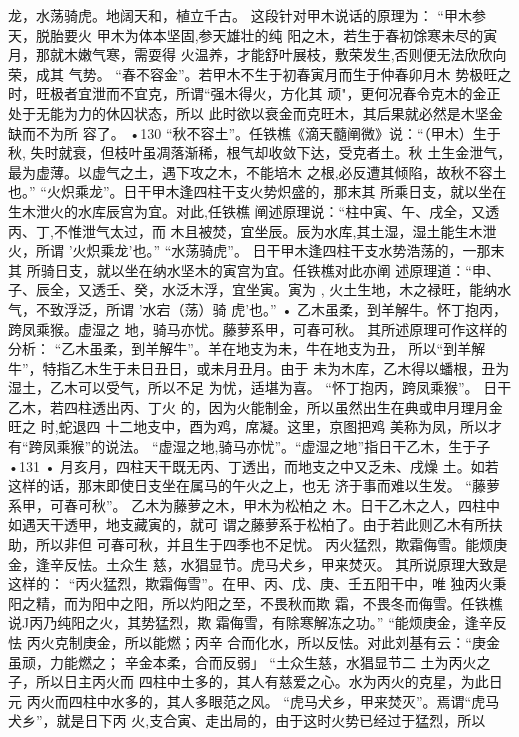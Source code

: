 龙，水荡骑虎。地阔天和，植立千古。
这段针对甲木说话的原理为：
“甲木参天，脱胎要火 甲木为体本坚固,参天雄壮的纯
阳之木，若生于春初馀寒未尽的寅月，那就木嫩气寒，需耍得
火温养，才能舒叶展枝，敷荣发生,否则便无法欣欣向荣，成其
气势。
“春不容金”。若甲木不生于初春寅月而生于仲春卯月木
势极旺之时，旺极者宜泄而不宜克，所谓“强木得火，方化其
顽"，更何况春令克木的金正处于无能为力的休囚状态，所以
此时欲以衰金而克旺木，其后果就必然是木坚金缺而不为所
容了。
•130
“秋不容土”。任铁樵《滴天髓阐微》说：“（甲木）生于秋,
失时就衰，但枝叶虽凋落渐稀，根气却收敛下达，受克者土。秋
土生金泄气，最为虚薄。以虚气之土，遇下攻之木，不能培木
之根,必反遭其倾陷，故秋不容土也。”
“火炽乘龙”。日干甲木逢四柱干支火势炽盛的，那末其
所乘日支，就以坐在生木泄火的水库辰宫为宜。对此,任铁樵
阐述原理说：“柱中寅、午、戌全，又透丙、丁,不惟泄气太过，而
木且被焚，宜坐辰。辰为水库,其土湿，湿土能生木泄火，所谓
'火炽乘龙'也。”
“水荡骑虎”。 日干甲木逢四柱干支水势浩荡的，一那末其
所骑日支，就以坐在纳水坚木的寅宫为宜。任铁樵对此亦阐
述原理道：“申、子、辰全，又透壬、癸，水泛木浮，宜坐寅。寅为
, 火土生地，木之禄旺，能纳水气，不致浮泛，所谓 '水宕（荡）骑
虎'也。” •
乙木虽柔，到羊解牛。怀丁抱丙，跨凤乘猴。虚湿之
地，骑马亦忧。藤萝系甲，可春可秋。
其所述原理可作这样的分析：
“乙木虽柔，到羊解牛”。羊在地支为未，牛在地支为丑，
所以“到羊解牛”，特指乙木生于未日丑日，或未月丑月。由于
未为木库，乙木得以蟠根，丑为湿土，乙木可以受气，所以不足
为忧，适堪为喜。
“怀丁抱丙，跨凤乘猴”。 日干乙木，若四柱透出丙、丁火
的，因为火能制金，所以虽然出生在典或申月理月金旺之
时,蛇退四 十二地支中，酉为鸡，席凝。这里，京图把鸡
美称为凤，所以才有“跨凤乘猴”的说法。
“虚湿之地,骑马亦忧”。“虚湿之地”指日干乙木，生于子
•131 •
月亥月，四柱天干既无丙、丁透出，而地支之中又乏未、戌燥
土。如若这样的话，那末即使日支坐在属马的午火之上，也无
济于事而难以生发。
“藤萝系甲，可春可秋”。 乙木为藤萝之木，甲木为松柏之
木。日干乙木之人，四柱中如遇天干透甲，地支藏寅的，就可
谓之藤萝系于松柏了。由于若此则乙木有所扶助，所以非但
可春可秋，并且生于四季也不足忧。
丙火猛烈，欺霜侮雪。能烦庚金，逢辛反怯。土众生
慈，水猖显节。虎马犬乡，甲来焚灭。
其所说原理大致是这样的：
“丙火猛烈，欺霜侮雪”。在甲、丙、戊、庚、壬五阳干中，唯
独丙火秉阳之精，而为阳中之阳，所以灼阳之至，不畏秋而欺
霜，不畏冬而侮雪。任铁樵说J丙乃纯阳之火，其势猛烈，欺
霜侮雪，有除寒解冻之功。”
“能烦庚金，逢辛反怯 丙火克制庚金，所以能燃；丙辛
合而化水，所以反怯。对此刘基有云：“庚金虽顽，力能燃之；
辛金本柔，合而反弱」
“土众生慈，水猖显节二 土为丙火之子，所以日主丙火而
四柱中土多的，其人有慈爱之心。水为丙火的克星，为此日元
丙火而四柱中水多的，其人多眼范之风。
“虎马犬乡，甲来焚灭”。焉谓“虎马犬乡”，就是日下丙
火,支合寅、走出局的，由于这时火势已经过于猛烈，所以
